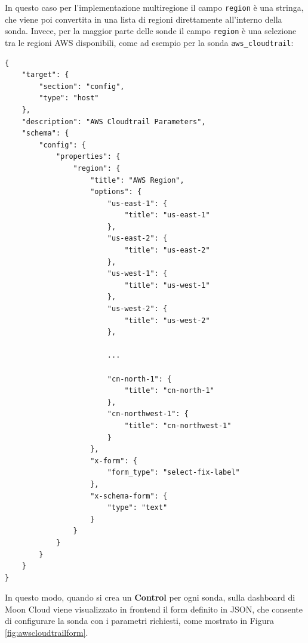 In questo caso per l'implementazione multiregione il campo \texttt{region} è una stringa, che viene poi convertita in una lista di regioni direttamente all'interno della sonda. Invece, per la maggior parte delle sonde il campo \texttt{region} è una selezione tra le regioni AWS disponibili, come ad esempio per la sonda \texttt{aws\_cloudtrail}:

\begin{lstlisting}[style=myjson, caption={Form di configurazione per la sonda \texttt{aws\_cloudtrail}}]
{
    "target": {
        "section": "config",
        "type": "host"
    },
    "description": "AWS Cloudtrail Parameters",
    "schema": {
        "config": {
            "properties": {
                "region": {
                    "title": "AWS Region",
                    "options": {
                        "us-east-1": {
                            "title": "us-east-1"
                        },
                        "us-east-2": {
                            "title": "us-east-2"
                        },
                        "us-west-1": {
                            "title": "us-west-1"
                        },
                        "us-west-2": {
                            "title": "us-west-2"
                        },

                        ...

                        "cn-north-1": {
                            "title": "cn-north-1"
                        },
                        "cn-northwest-1": {
                            "title": "cn-northwest-1"
                        }
                    },
                    "x-form": {
                        "form_type": "select-fix-label"
                    },
                    "x-schema-form": {
                        "type": "text"
                    }
                }
            }
        }
    }
}
\end{lstlisting}

In questo modo, quando si crea un \textbf{Control} per ogni sonda, sulla dashboard di Moon Cloud viene visualizzato in frontend il form definito in JSON, che consente di configurare la sonda con i parametri richiesti, come mostrato in Figura \ref{fig:awscloudtrailform}.

